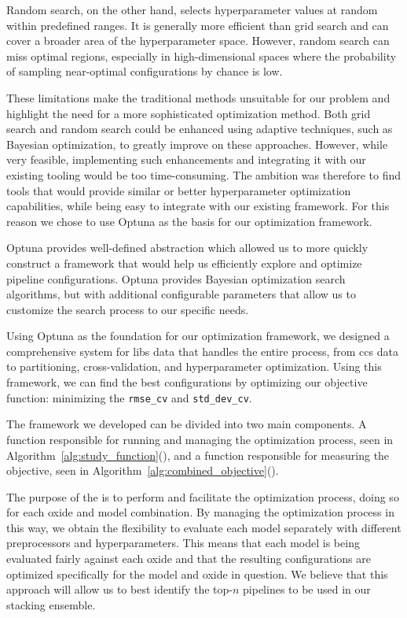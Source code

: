 Random search, on the other hand, selects hyperparameter values at random within predefined ranges. 
It is generally more efficient than grid search and can cover a broader area of the hyperparameter space. 
However, random search can miss optimal regions, especially in high-dimensional spaces where the probability of sampling near-optimal configurations by chance is low. 

These limitations make the traditional methods unsuitable for our problem and highlight the need for a more sophisticated optimization method.
Both grid search and random search could be enhanced using adaptive techniques, such as Bayesian optimization, to greatly improve on these approaches.
However, while very feasible, implementing such enhancements and integrating it with our existing tooling would be too time-consuming.
The ambition was therefore to find tools that would provide similar or better hyperparameter optimization capabilities, while being easy to integrate with our existing framework.
For this reason we chose to use Optuna as the basis for our optimization framework.

Optuna provides well-defined abstraction which allowed us to more quickly construct a framework that would help us efficiently explore and optimize pipeline configurations\cite{optuna_2019}.
Optuna provides Bayesian optimization search algorithms, but with additional configurable parameters that allow us to customize the search process to our specific needs.

Using Optuna as the foundation for our optimization framework, we designed a comprehensive system for \gls{libs} data that handles the entire process, from \gls{ccs} data to partitioning, cross-validation, and hyperparameter optimization.
Using this framework, we can find the best configurations by optimizing our objective function: minimizing the \texttt{rmse\_cv} and \texttt{std\_dev\_cv}.

The framework we developed can be divided into two main components.
A function responsible for running and managing the optimization process, seen in Algorithm~\ref{alg:study_function}(), and a function responsible for measuring the objective, seen in Algorithm~\ref{alg:combined_objective}().

The purpose of the  is to perform and facilitate the optimization process, doing so for each oxide and model combination.
By managing the optimization process in this way, we obtain the flexibility to evaluate each model separately with different preprocessors and hyperparameters.
This means that each model is being evaluated fairly against each oxide and that the resulting configurations are optimized specifically for the model and oxide in question.
We believe that this approach will allow us to best identify the top-$n$ pipelines to be used in our stacking ensemble.

